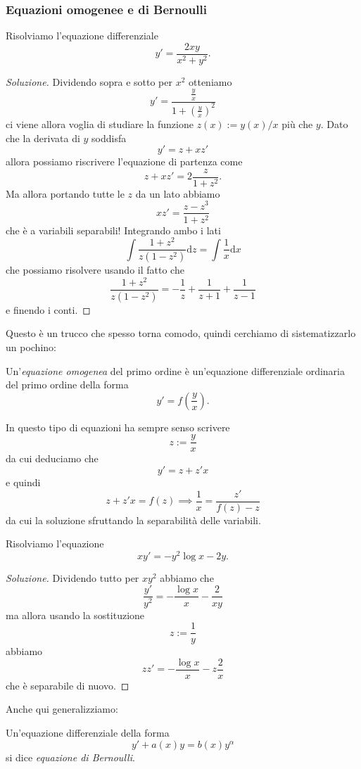 \documentclass[11pt]{scrartcl}
\newcommand{\dif}{\text{d}}
\begin{document}
	\subsubsection{Equazioni omogenee e di Bernoulli}
	
	\begin{example}
		Risolviamo l'equazione differenziale
		$$y'=\frac{2xy}{x^2+y^2}.$$
	\end{example}
	\begin{proof}[Soluzione]
		Dividendo sopra e sotto per $x^2$ otteniamo
		$$y'=\frac{\frac{y}{x}}{1+\left(\frac{y}{x}\right)^2}$$
		ci viene allora voglia di studiare la funzione $z(x):=y(x)/x$ più che $y$. Dato che la derivata di $y$ soddisfa
		$$y'=z+xz'$$
		allora possiamo riscrivere l'equazione di partenza come
		$$z+xz'=2\frac{z}{1+z^2}.$$
		Ma allora portando tutte le $z$ da un lato abbiamo
		$$xz'=\frac{z-z^3}{1+z^2}$$
		che è a variabili separabili! Integrando ambo i lati 
		$$\int \frac{1+z^2}{z(1-z^2)}\dif z=\int \frac{1}{x}\dif x$$
		che possiamo risolvere usando il fatto che 
		$$\frac{1+z^2}{z(1-z^2)}=-\frac{1}{z}+\frac{1}{z+1}+\frac{1}{z-1}$$
		e finendo i conti.  
	\end{proof}
	Questo è un trucco che spesso torna comodo, quindi cerchiamo di sistematizzarlo un pochino:
	\begin{definition}
		Un'\textit{equazione omogenea} del primo ordine è un'equazione differenziale ordinaria del primo ordine della forma
		$$y'=f\left(\frac{y}{x}\right).$$
	\end{definition}
	In questo tipo di equazioni ha sempre senso scrivere
	$$z:=\frac{y}{x}$$ 
	da cui deduciamo che
	$$y'=z+z'x$$
	e quindi 
	$$z+z'x=f(z) \implies \frac{1}{x}=\frac{z'}{f(z)-z}$$
	da cui la soluzione sfruttando la separabilità delle variabili.
	\begin{example}
		Risolviamo l'equazione
		$$xy'=-y^2\log x - 2y.$$
	\end{example}
	\begin{proof}[Soluzione]
		Dividendo tutto per $xy^2$ abbiamo che
		$$\frac{y'}{y^2}=-\frac{\log x}{x}-\frac{2}{xy}$$
		ma allora usando la sostituzione
		$$z:=\frac{1}{y}$$
		abbiamo
		$$zz'=-\frac{\log x}{x}-z\frac{2}{x}$$
		che è separabile di nuovo.
	\end{proof}
	Anche qui generalizziamo:
	\begin{definition}
		Un'equazione differenziale della forma
		$$y'+a(x)y=b(x)y^\alpha$$
		si dice \textit{equazione di Bernoulli}.
	\end{definition}
\end{document}
